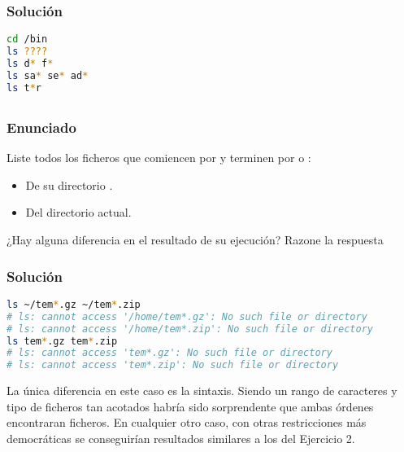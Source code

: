 \subsubsection{Solución}

\begin{lstlisting}[language=sh]
cd /bin
ls ????
ls d* f*
ls sa* se* ad*
ls t*r
\end{lstlisting}

\subsection{}\label{ej1-8}

\subsubsection{Enunciado}

Liste todos los ficheros que comiencen por  y terminen por  o :

\begin{itemize}
	\item De su directorio .
	\item Del directorio actual.
\end{itemize}

¿Hay alguna diferencia en el resultado de su ejecución? Razone la respuesta

\subsubsection{Solución}

\begin{lstlisting}[language=sh]
ls ~/tem*.gz ~/tem*.zip
# ls: cannot access '/home/tem*.gz': No such file or directory
# ls: cannot access '/home/tem*.zip': No such file or directory
ls tem*.gz tem*.zip
# ls: cannot access 'tem*.gz': No such file or directory
# ls: cannot access 'tem*.zip': No such file or directory
\end{lstlisting}

La única diferencia en este caso es la sintaxis.
Siendo un rango de caracteres y tipo de ficheros tan acotados habría sido sorprendente que ambas órdenes encontraran ficheros.
En cualquier otro caso, con otras restricciones más democráticas se conseguirían resultados similares a los del Ejercicio 2.

\subsection{}\label{ej1-9}

